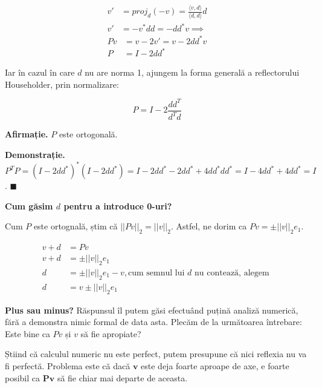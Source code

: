\documentclass{exam}
\begin{document}
\begin{align*}
	v' & = proj_d (-v) = \frac{\langle v, d \rangle}{\langle d, d \rangle} d \\
	v' & = - v^* d d = - d d^* v \implies
\end{align*}
\begin{align*}
	P v & = v - 2 v' = v - 2 d d^* v \\
	P   & = I - 2 d d^*
\end{align*}

\par Iar în cazul în care $d$ nu are norma 1, ajungem la forma generală a
reflectorului Householder, prin normalizare:

\begin{equation*}
	P = I - 2 \frac{d d^T}{d^T d}
\end{equation*}

\par \textbf{Afirmație.} $P$ este ortogonală.

\par \textbf{Demonstrație.} $P^TP = (I - 2 d d^*)^*(I - 2 d d^*) = I - 2 d d^* - 2 d d^* + 4 d d^* d d^* = I - 4 d d^* + 4 d d^* = I$. $\blacksquare$

\par \textbf{Cum găsim $d$ pentru a introduce 0-uri?}

\par Cum $P$ este ortognală, știm că $||Pv||_2 = ||v||_2$. Astfel, ne dorim ca $Pv = \pm ||v||_2 e_1$.

\begin{align*}
	v + d & = P v                                                                        \\
	v + d & = \pm ||v||_2 e_1                                                            \\
	d     & = \pm ||v||_2 e_1 - v, \text{cum semnul lui } d \text{ nu contează, alegem } \\
	d     & = v \pm ||v||_2 e_1
\end{align*}

\par \textbf{Plus sau minus?} Răspunsul îl putem găsi efectuând puțină analiză
numerică, fără a demonstra nimic formal de data asta. Plecăm de la următoarea
întrebare: Este bine ca $Pv$ și $v$ să fie apropiate?

\par Știind că calculul numeric nu este perfect, putem presupune că nici
reflexia nu va fi perfectă. Problema este că dacă $\mathbf{v}$ este deja foarte
aproape de axe, e foarte posibil ca $\mathbf{Pv}$ să fie chiar mai departe de
aceasta.
\end{document}
